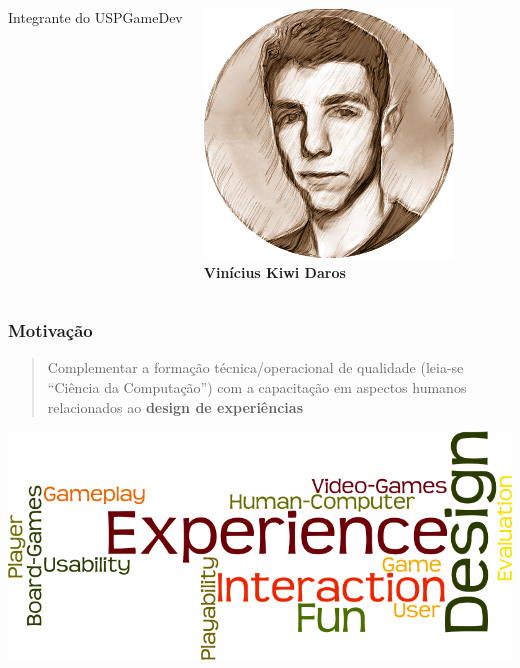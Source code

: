 \expandafter\documentclass\expandafter[table, usenames, svgnames, dvipsnames, \classopts]{beamer}
\begin{document}
\begin{frame}
\begin{columns}[c]
\begin{outline}
				\1 Integrante do USPGameDev
			\end{outline}
		
		
			\begin{center}
				\includegraphics[height=0.2\paperheight]{vinicius}\\
				\textbf{Vinícius Kiwi Daros}
			\end{center}
		
	\end{columns}	

\end{frame}

\begin{frame}
	\frametitle{\textbf{Motivação}}
	
	\begin{block}{}
	
		\vspace{1em}
	
		\begin{quotation}
			\noindent
			\justify
			{\large Complementar a formação técnica/operacional de qualidade (leia-se ``Ciência da Computação'') com a capacitação em aspectos humanos relacionados ao \textbf{design de experiências}}
		\end{quotation}

		\vspace{1em}

	\end{block}
	
	\begin{center}
		\includegraphics[height=0.4\paperheight]{word-cloud}\\
	\end{center}

\end{frame}
\end{document}
